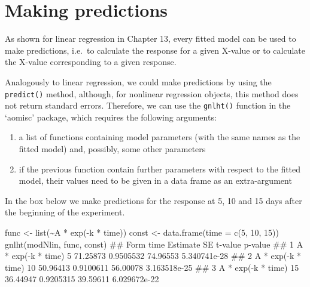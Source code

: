 \documentclass[a4paper,12pt,oneside]{book}
\providecommand{\tightlist}{%
  \setlength{\itemsep}{0pt}\setlength{\parskip}{0pt}}
\newenvironment{Shaded}{\begin{snugshade}}{\end{snugshade}}
\newcommand{\DecValTok}[1]{#1}
\newcommand{\SpecialCharTok}[1]{#1}
\newcommand{\DocumentationTok}[1]{#1}
\newcommand{\OtherTok}[1]{#1}
\newcommand{\FunctionTok}[1]{#1}
\newcommand{\AttributeTok}[1]{#1}
\newcommand{\NormalTok}[1]{#1}
\begin{document}
\hypertarget{making-predictions-1}{%
\section{Making predictions}\label{making-predictions-1}}

As shown for linear regression in Chapter 13, every fitted model can be used to make predictions, i.e.~to calculate the response for a given X-value or to calculate the X-value corresponding to a given response.

Analogously to linear regression, we could make predictions by using the \texttt{predict()} method, although, for nonlinear regression objects, this method does not return standard errors. Therefore, we can use the \texttt{gnlht()} function in the `aomisc' package, which requires the following arguments:

\begin{enumerate}
\def\labelenumi{\arabic{enumi}.}
\tightlist
\item
  a list of functions containing model parameters (with the same names as the fitted model) and, possibly, some other parameters
\item
  if the previous function contain further parameters with respect to the fitted model, their values need to be given in a data frame as an extra-argument
\end{enumerate}

In the box below we make predictions for the response at 5, 10 and 15 days after the beginning of the experiment.

\vspace{12pt}

\begin{Shaded}
\begin{Highlighting}[]
\NormalTok{func }\OtherTok{\textless{}{-}} \FunctionTok{list}\NormalTok{(}\SpecialCharTok{\textasciitilde{}}\NormalTok{A }\SpecialCharTok{*} \FunctionTok{exp}\NormalTok{(}\SpecialCharTok{{-}}\NormalTok{k }\SpecialCharTok{*}\NormalTok{ time))}
\NormalTok{const }\OtherTok{\textless{}{-}} \FunctionTok{data.frame}\NormalTok{(}\AttributeTok{time =} \FunctionTok{c}\NormalTok{(}\DecValTok{5}\NormalTok{, }\DecValTok{10}\NormalTok{, }\DecValTok{15}\NormalTok{)) }
\FunctionTok{gnlht}\NormalTok{(modNlin, func,  const)}
\DocumentationTok{\#\#                 Form time Estimate        SE  t{-}value      p{-}value}
\DocumentationTok{\#\# 1 A * exp({-}k * time)    5 71.25873 0.9505532 74.96553 5.340741e{-}28}
\DocumentationTok{\#\# 2 A * exp({-}k * time)   10 50.96413 0.9100611 56.00078 3.163518e{-}25}
\DocumentationTok{\#\# 3 A * exp({-}k * time)   15 36.44947 0.9205315 39.59611 6.029672e{-}22}
\end{Highlighting}
\end{Shaded}
\end{document}
